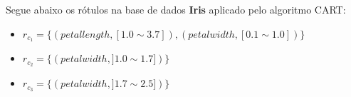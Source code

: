%  
%     
%     
%  


Segue abaixo os rótulos na base de dados \textbf{Iris} aplicado pelo algoritmo CART:
\begin{itemize}[noitemsep]
 \item ${r_{c_1}=\{ (petallength, [ 1.0 \sim 3.7]), (petalwidth,[ 0.1 \sim 1.0 ] ) \} }$  
 \item ${r_{c_2}=\{  (petalwidth,] 1.0 \sim 1.7 ] )\} }$
 \item ${r_{c_3}=\{ (petalwidth, ] 1.7 \sim 2.5 ]) \} }$
\end{itemize}


